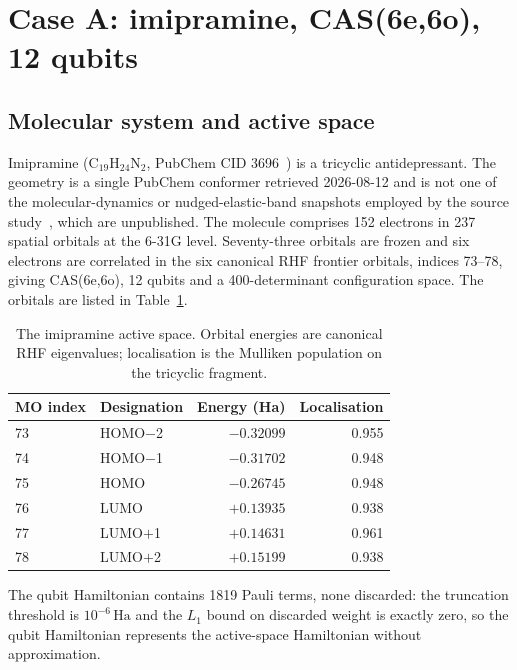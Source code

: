 \documentclass[11pt,a4paper]{article}
\newcommand{\Ha}{\ensuremath{\,\mathrm{Ha}}}
\begin{document}
\section{Case A: imipramine, CAS(6e,6o), 12 qubits}
\label{sec:A}

\subsection{Molecular system and active space}

Imipramine (C$_{19}$H$_{24}$N$_2$, PubChem CID 3696~\cite{pubchem}) is a
tricyclic antidepressant. The geometry is a single PubChem conformer retrieved
2026-08-12 and is not one of the molecular-dynamics or nudged-elastic-band
snapshots employed by the source study~\cite{koziell}, which are unpublished.
The molecule comprises 152 electrons in 237 spatial orbitals at the 6-31G
level. Seventy-three orbitals are frozen and six electrons are correlated in
the six canonical RHF frontier orbitals, indices 73--78, giving CAS(6e,6o), 12
qubits and a 400-determinant configuration space. The orbitals are listed in
Table~\ref{tab:A:space}.

\begin{table}[htbp]
\centering
\small
\caption{The imipramine active space. Orbital energies are canonical RHF
eigenvalues; localisation is the Mulliken population on the tricyclic
fragment.}
\label{tab:A:space}
\begin{tabular}{@{}llrr@{}}
\toprule
MO index & Designation & Energy (Ha) & Localisation \\
\midrule
73 & HOMO$-$2 & $-0.32099$ & 0.955 \\
74 & HOMO$-$1 & $-0.31702$ & 0.948 \\
75 & HOMO     & $-0.26745$ & 0.948 \\
76 & LUMO     & $+0.13935$ & 0.938 \\
77 & LUMO$+$1 & $+0.14631$ & 0.961 \\
78 & LUMO$+$2 & $+0.15199$ & 0.938 \\
\bottomrule
\end{tabular}
\end{table}

The qubit Hamiltonian contains 1819 Pauli terms, none discarded: the truncation
threshold is $10^{-6}\Ha$ and the $L_1$ bound on discarded weight is exactly
zero, so the qubit Hamiltonian represents the active-space Hamiltonian without
approximation.
\end{document}
